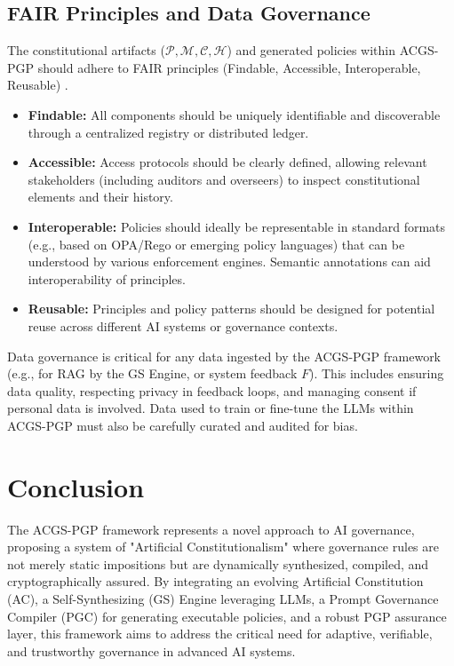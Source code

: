 \documentclass[sigconf,review,screen]{acmart}
\begin{document}
\subsection{FAIR Principles and Data Governance}
The constitutional artifacts ($\mathcal{P}, \mathcal{M}, \mathcal{C}, \mathcal{H}$) and generated policies within ACGS-PGP should adhere to FAIR principles (Findable, Accessible, Interoperable, Reusable) \cite{wilkinson2016fair}.
\begin{itemize}
    \item \textbf{Findable:} All components should be uniquely identifiable and discoverable through a centralized registry or distributed ledger.
    \item \textbf{Accessible:} Access protocols should be clearly defined, allowing relevant stakeholders (including auditors and overseers) to inspect constitutional elements and their history.
    \item \textbf{Interoperable:} Policies should ideally be representable in standard formats (e.g., based on OPA/Rego or emerging policy languages) that can be understood by various enforcement engines. Semantic annotations can aid interoperability of principles.
    \item \textbf{Reusable:} Principles and policy patterns should be designed for potential reuse across different AI systems or governance contexts.
\end{itemize}
Data governance is critical for any data ingested by the ACGS-PGP framework (e.g., for RAG by the GS Engine, or system feedback $F$). This includes ensuring data quality, respecting privacy in feedback loops, and managing consent if personal data is involved. Data used to train or fine-tune the LLMs within ACGS-PGP must also be carefully curated and audited for bias.

\section{Conclusion}
The ACGS-PGP framework represents a novel approach to AI governance, proposing a system of "Artificial Constitutionalism" where governance rules are not merely static impositions but are dynamically synthesized, compiled, and cryptographically assured. By integrating an evolving Artificial Constitution (AC), a Self-Synthesizing (GS) Engine leveraging LLMs, a Prompt Governance Compiler (PGC) for generating executable policies, and a robust PGP assurance layer, this framework aims to address the critical need for adaptive, verifiable, and trustworthy governance in advanced AI systems.
\end{document}
